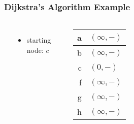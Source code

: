\documentclass[dvipsnames]{beamer}
\begin{document}
\begin{frame}
  \frametitle{Dijkstra's Algorithm Example}

  \begin{example}[initialization]
    \begin{columns}
      \begin{center}
      \end{center}

      \begin{itemize}
        \item starting node: $c$
      \end{itemize}

      \begin{table}
        \begin{tabular}{r|l}
          a & $(\infty,-)$ \\\hline
          b & $(\infty,-)$ \\\hline
          c & $(0,-)$      \\\hline
          f & $(\infty,-)$ \\\hline
          g & $(\infty,-)$ \\\hline
          h & $(\infty,-)$
        \end{tabular}
      \end{table}
    \end{columns}
  \end{example}
\end{frame}
\end{document}
